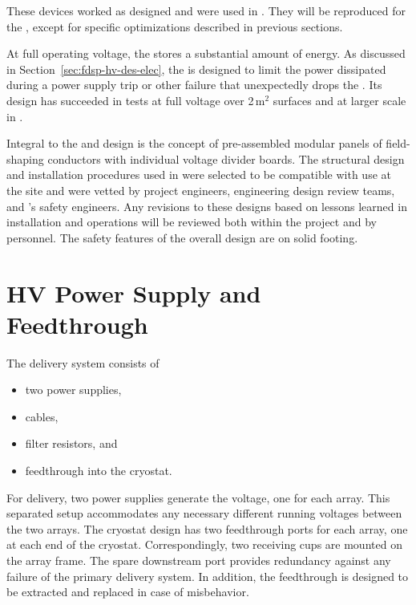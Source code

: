 These devices worked as designed and were used in . They will be reproduced for the ,  except for specific optimizations described in previous sections.

At full operating voltage, the  stores a substantial amount of energy.
As discussed in Section~\ref{sec:fdsp-hv-des-elec}, the  is designed to limit the power dissipated during a power supply trip or other failure that unexpectedly drops the .
Its design has succeeded in tests at full voltage over \num{2}\,m$^2$ surfaces and at larger scale in .  

Integral to the  and  design is the concept of pre-assembled modular panels of field-shaping conductors with individual voltage divider boards. The structural design and installation procedures used in  were selected to be compatible with use at the  site and were vetted by project engineers, engineering design review teams, and 's safety engineers. Any revisions to these designs based on lessons learned in   installation and operations will be reviewed both within the project and by   personnel. The safety features of the overall design are on solid footing. 




\section {HV Power Supply and Feedthrough}
\label{sec:fdsp-hv-des-hvps}

The  delivery system consists of
\begin{itemize}
\item two power supplies,
\item {} cables,
\item filter resistors, and
\item {} feedthrough into the cryostat.
\end{itemize}

For  delivery, two power supplies generate the voltage, one for each  array. 
This separated setup accommodates any necessary different running voltages between the two  arrays.
The cryostat design has two feedthrough ports for each  array, one at each end of the cryostat. Correspondingly, two  receiving cups are mounted on the  array frame. The spare downstream port provides redundancy against any failure of the primary  delivery system. In addition, the  feedthrough is designed to be extracted and replaced in case of misbehavior.

